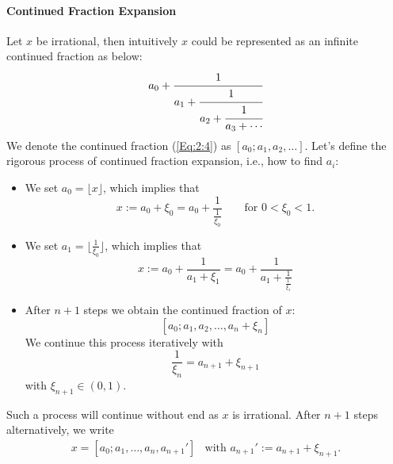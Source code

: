 \paragraph{Continued Fraction Expansion}
Let $x$ be irrational, then intuitively $x$ could be represented as an infinite continued fraction as below:
\begin{equation}\label{Eq:2:4}
a_0+\cfrac{1}{a_1+\cfrac{1}{a_2+\cfrac{1}{a_3+\cdots}}}
\end{equation}
We denote the continued fraction (\ref{Eq:2:4}) as $[a_0;a_1,a_2,\dots]$. Let's define the rigorous process of continued fraction expansion, i.e., how to find $a_i$:
\begin{itemize}
\item
We set $a_0=\lfloor{x}\rfloor$, which implies that
\[
x:=a_0+\xi_0=a_0+\frac{1}{\frac{1}{\xi_0}}\qquad
\mbox{for $0<\xi_0<1$.}
\]
\item
We set $a_1=\lfloor{\frac{1}{\xi_0}}\rfloor$, which implies that
\[
x:=a_0+\frac{1}{a_1+\xi_1}=a_0+\frac{1}{a_1+\frac{1}{\frac{1}{\xi_1}}}
\]
\item
After $n+1$ steps we obtain the continued fraction of $x$:
\[
[a_0;a_1,a_2,\dots,a_n+\xi_n]
\]
We continue this process iteratively with
\[
\frac{1}{\xi_n} = a_{n+1} +\xi_{n+1}
\]
with $\xi_{n+1}\in(0,1)$.
\end{itemize}
Such a process will continue without end as $x$ is irrational. After $n+1$ steps alternatively, we write
\[
\begin{array}{ll}
x=[a_0;a_1,\dots,a_n,a_{n+1}']
&
\mbox{with }a_{n+1}':=a_{n+1}+\xi_{n+1}.
\end{array}
\]

